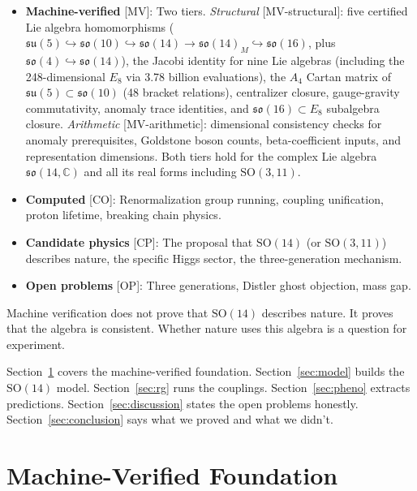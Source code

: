 \documentclass[aps,prd,twocolumn,showpacs,preprintnumbers,superscriptaddress,floatfix]{revtex4-2}
\newcommand{\so}{\mathfrak{so}}
\newcommand{\su}{\mathfrak{su}}
\begin{document}
\begin{itemize}
\item \textbf{Machine-verified} [MV]: Two tiers.  \emph{Structural} [MV-structural]: five certified Lie algebra homomorphisms ($\su(5) \hookrightarrow \so(10) \hookrightarrow \so(14) \to \so(14)_M \hookrightarrow \so(16)$, plus $\so(4) \hookrightarrow \so(14)$), the Jacobi identity for nine Lie algebras (including the 248-dimensional $E_8$ via 3.78 billion evaluations), the $A_4$ Cartan matrix of $\su(5) \subset \so(10)$ (48 bracket relations), centralizer closure, gauge-gravity commutativity, anomaly trace identities, and $\so(16) \subset E_8$ subalgebra closure.  \emph{Arithmetic} [MV-arithmetic]: dimensional consistency checks for anomaly prerequisites, Goldstone boson counts, beta-coefficient inputs, and representation dimensions.  Both tiers hold for the complex Lie algebra $\so(14,\mathbb{C})$ and all its real forms including $\mathrm{SO}(3,11)$.
\item \textbf{Computed} [CO]: Renormalization group running, coupling
  unification, proton lifetime, breaking chain physics.
\item \textbf{Candidate physics} [CP]: The proposal that $\mathrm{SO}(14)$
  (or $\mathrm{SO}(3,11)$) describes nature, the specific Higgs sector,
  the three-generation mechanism.
\item \textbf{Open problems} [OP]: Three generations, Distler ghost
  objection, mass gap.
\end{itemize}

Machine verification does not prove that $\mathrm{SO}(14)$ describes nature.
It proves that the algebra is consistent.  Whether nature uses this
algebra is a question for experiment.

Section~\ref{sec:foundation} covers the machine-verified foundation.
Section~\ref{sec:model} builds the $\mathrm{SO}(14)$ model.
Section~\ref{sec:rg} runs the couplings.
Section~\ref{sec:pheno} extracts predictions.
Section~\ref{sec:discussion} states the open problems honestly.
Section~\ref{sec:conclusion} says what we proved and what we didn't.

\section{Machine-Verified Foundation}
\label{sec:foundation}
\end{document}
